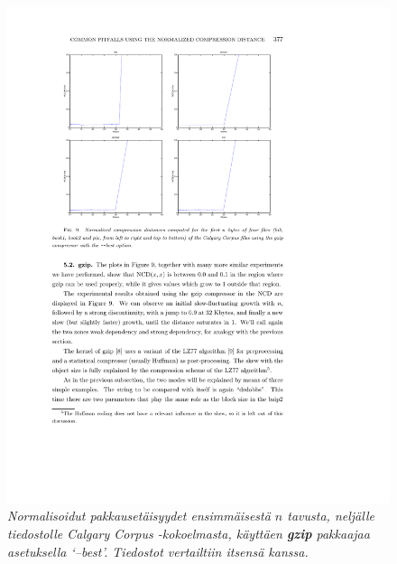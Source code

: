 \documentclass[12pt,finnish]{tktltiki2}
\theoremstyle{definition}
\theoremstyle{remark}
\begin{document}
    \begin{figure}[!htb]
      \includegraphics[width=\textwidth]{img/gzip-best}
      \caption{\emph{Normalisoidut pakkausetäisyydet ensimmäisestä $n$ tavusta, neljälle tiedostolle Calgary Corpus -kokoelmasta, käyttäen \textbf{gzip} pakkaajaa asetuksella `--best'. Tiedostot vertailtiin itsensä kanssa.} \cite{cebrian2005common}}
      \label{fig:gzip-best}
    \end{figure}
\end{document}
